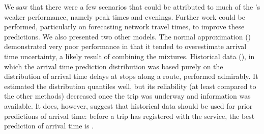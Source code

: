 We saw that there were a few scenarios that could be attributed to much of the \pf{}'s weaker performance, namely peak times and evenings. Further work could be performed, particularly on forecasting network travel times, to improve these predictions. We also presented two other models. The normal approximation (\Fnorm{}) demonstrated very poor performance in that it tended to overestimate arrival time uncertainty, a likely result of combining the mixtures. Historical data (\Fhist{}), in which the arrival time prediction distribution was based purely on the distribution of arrival time delays at stops along a route, performed admirably. It estimated the distribution quantiles well, but its reliability (at least compared to the other methods) decreased once the trip was underway and \rt{} information was available. It does, however, suggest that historical data should be used for prior predictions of arrival time: before a trip has registered with the \rt{} service, the best prediction of arrival time is \Fhist{}.
